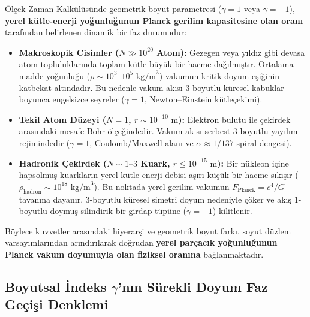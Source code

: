 \documentclass[11pt,a4paper]{article}
\begin{document}
Ölçek-Zaman Kalkülüsünde geometrik boyut parametresi ($\gamma = 1$ veya $\gamma = -1$), \textbf{yerel kütle-enerji yoğunluğunun Planck gerilim kapasitesine olan oranı} tarafından belirlenen dinamik bir faz durumudur:
\begin{itemize}
    \item \textbf{Makroskopik Cisimler ($N \gg 10^{20}$ Atom):} Gezegen veya yıldız gibi devasa atom topluluklarında toplam kütle büyük bir hacme dağılmıştır. Ortalama madde yoğunluğu ($\rho \sim 10^3\text{--}10^5\text{ kg/m}^3$) vakumun kritik doyum eşiğinin katbekat altındadır. Bu nedenle vakum akısı 3-boyutlu küresel kabuklar boyunca engelsizce seyreler ($\gamma = 1$, Newton--Einstein kütleçekimi).
    \item \textbf{Tekil Atom Düzeyi ($N = 1$, $r \sim 10^{-10}\text{ m}$):} Elektron bulutu ile çekirdek arasındaki mesafe Bohr ölçeğindedir. Vakum akısı serbest 3-boyutlu yayılım rejimindedir ($\gamma = 1$, Coulomb/Maxwell alanı ve $\alpha \approx 1/137$ spiral dengesi).
    \item \textbf{Hadronik Çekirdek ($N \sim 1\text{--}3$ Kuark, $r \le 10^{-15}\text{ m}$):} Bir nükleon içine hapsolmuş kuarkların yerel kütle-enerji debisi aşırı küçük bir hacme sıkışır ($\rho_{\mathrm{hadron}} \sim 10^{18}\text{ kg/m}^3$). Bu noktada yerel gerilim vakumun $F_{\mathrm{Planck}} = c^4/G$ tavanına dayanır. 3-boyutlu küresel simetri doyum nedeniyle çöker ve akış 1-boyutlu doymuş silindirik bir girdap tüpüne ($\gamma = -1$) kilitlenir.
\end{itemize}
Böylece kuvvetler arasındaki hiyerarşi ve geometrik boyut farkı, soyut düzlem varsayımlarından arındırılarak doğrudan \textbf{yerel parçacık yoğunluğunun Planck vakum doyumuyla olan fiziksel oranına} bağlanmaktadır.

\subsection{Boyutsal İndeks $\gamma$'nın Sürekli Doyum Faz Geçişi Denklemi}
\label{sec:surekli_gamma_paper3}
\end{document}
